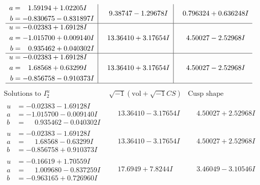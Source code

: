 \documentclass[1p]{elsarticle_modified}
\theoremstyle{definition}
\newcommand{\I}{\sqrt{-1}}
\begin{document}
$$\begin{array}{c|c|c}
\begin{aligned}
a &= \phantom{-}1.59194 + 1.02205 I \\
b &= -0.830675 - 0.831897 I\end{aligned}
 & \phantom{-}9.38747 - 1.29678 I & \phantom{-}0.796324 + 0.636248 I \\ \hline\begin{aligned}
u &= -0.02383 + 1.69128 I \\
a &= -1.015700 + 0.009140 I \\
b &= \phantom{-}0.935462 + 0.040302 I\end{aligned}
 & \phantom{-}13.36410 + 3.17654 I & \phantom{-}4.50027 - 2.52968 I \\ \hline\begin{aligned}
u &= -0.02383 + 1.69128 I \\
a &= \phantom{-}1.68568 + 0.63299 I \\
b &= -0.856758 - 0.910373 I\end{aligned}
 & \phantom{-}13.36410 + 3.17654 I & \phantom{-}4.50027 - 2.52968 I\\
 \hline 
 \end{array}$$\newpage$$\begin{array}{c|c|c}  
\text{Solutions to }I^u_{2}& \I (\text{vol} + \sqrt{-1}CS) & \text{Cusp shape}\\
 \hline 
\begin{aligned}
u &= -0.02383 - 1.69128 I \\
a &= -1.015700 - 0.009140 I \\
b &= \phantom{-}0.935462 - 0.040302 I\end{aligned}
 & \phantom{-}13.36410 - 3.17654 I & \phantom{-}4.50027 + 2.52968 I \\ \hline\begin{aligned}
u &= -0.02383 - 1.69128 I \\
a &= \phantom{-}1.68568 - 0.63299 I \\
b &= -0.856758 + 0.910373 I\end{aligned}
 & \phantom{-}13.36410 - 3.17654 I & \phantom{-}4.50027 + 2.52968 I \\ \hline\begin{aligned}
u &= -0.16619 + 1.70559 I \\
a &= \phantom{-}1.009680 - 0.837259 I \\
b &= -0.963165 + 0.726960 I\end{aligned}
 & \phantom{-}17.6949 + 7.8244 I & \phantom{-}3.46049 - 3.10546 I \\ \hline\begin{aligned}

\end{aligned}
\end{array}$$
\end{document}
